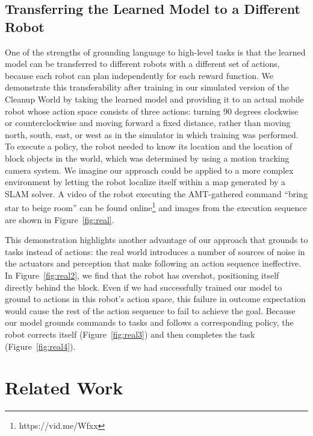 \documentclass[conference]{IEEEtran}
\begin{document}
\subsection{Transferring the Learned Model to a Different Robot}
One of the strengths of grounding language to high-level tasks is that the learned model can be transferred to different robots with a different set of actions, because each robot can plan independently for each reward function. We demonstrate this transferability after training in our simulated version of the Cleanup World by taking the learned model and providing it to an actual mobile robot whose action space consists of three actions: turning 90 degrees clockwise or counterclockwise and moving forward a fixed distance, rather than moving north, south, east, or west as in the simulator in which training was performed. To execute a policy, the robot needed to know its location and the location of block objects in the world, which was determined by using a motion tracking camera system. We imagine our approach could be applied to a more complex environment by letting the robot localize itself within a map generated by a SLAM solver. A video of the robot executing the AMT-gathered command ``bring star to beige room'' can be found online\footnote{https://vid.me/Wfxx} and images from the execution sequence are shown in Figure~\ref{fig:real}.

This demonstration highlights another advantage of our approach that grounds to tasks instead of actions: the real world introduces a number of sources of noise in the actuators and perception that make following an action sequence ineffective. In Figure~\ref{fig:real2}, we find that the robot has overshot, positioning itself directly behind the block. Even if we had successfully trained our model to ground to actions in this robot's action space, this failure in outcome expectation would cause the rest of the action sequence to fail to achieve the goal. Because our model grounds commands to tasks and follows a corresponding policy, the robot corrects itself (Figure~\ref{fig:real3}) and then completes the task (Figure~\ref{fig:real4}).



\section{Related Work}
\label{s:rel_work}
\end{document}
